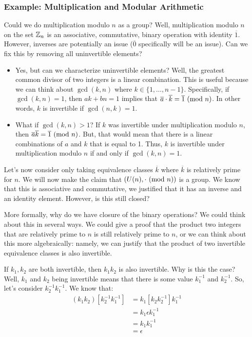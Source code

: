 \documentclass[letterpaper]{article}
\begin{document}
\subsubsection{Example: Multiplication and Modular Arithmetic}
Could we do multiplication modulo $n$ as a group? Well, multiplication modulo $n$ on the set $\mathbb{Z}_n$ is an associative, commutative, binary operation with identity $\overline{1}$. However, inverses are potentially an issue ($\overline{0}$ specifically will be an issue). Can we fix this by removing all uninvertible elements? 
\begin{itemize}
    \item Yes, but can we characterize uninvertible elements? Well, the greatest common divisor of two integers is a linear combination. This is useful because we can think about $\gcd(k, n)$ where $k \in \{1, \dots, n - 1\}$. Specifically, if $\gcd(k, n) = 1$, then $ak + bn = 1$ implies that $\overline{a} \cdot \overline{k} = \overline{1} \ (\mathrm{mod}\ n)$. In other words, $k$ is invertible if $\gcd(n, k) = 1$. 
    \item What if $\gcd(k, n) > 1$? If $k$ was invertible under multiplication modulo $n$, then $\overline{a} \overline{k} = \overline{1} \ (\mathrm{mod}\ n)$. But, that would mean that there is a linear combinations of $a$ and $k$ that is equal to 1. Thus, $k$ is invertible under multiplication modulo $n$ if and only if $\gcd(k, n) = 1$. 
\end{itemize}
Let's now consider only taking equivalence classes $\overline{k}$ where $\overline{k}$ is relatively prime for $n$. We will now make the claim that $(U(n), \cdot \ (\mathrm{mod}\ n))$ is a group. We know that this is associative and commutative, we justified that it has an inverse and an identity element. However, is this still closed? 

\bigskip 

More formally, why do we have closure of the binary operations? We could think about this in several ways. We could give a proof that the product two integers that are relatively prime to $n$ is still relatively prime to $n$, or we can think about this more algebraically: namely, we can justify that the product of two invertible equivalence classes is also invertible. 

\bigskip 

If $k_1, k_2$ are both invertible, then $k_1 k_2$ is also invertible. Why is this the case? Well, $k_1$ and $k_2$ being invertible means that there is some value $k_1^{-1}$ and $k_2^{-1}$. So, let's consider $k_2^{-1} k_1^{-1}$. We know that:
\begin{equation*}
    \begin{aligned}
        (k_1 k_2) \left[k_2^{-1} k_1^{-1}\right] &= k_1 \left[k_2 k_2^{-1}\right] k_1^{-1} \\ 
            &= k_1 \epsilon k_1^{-1} \\ 
            &= k_1 k_1^{-1} \\ 
            &= \epsilon
    \end{aligned}
\end{equation*}
\end{document}

